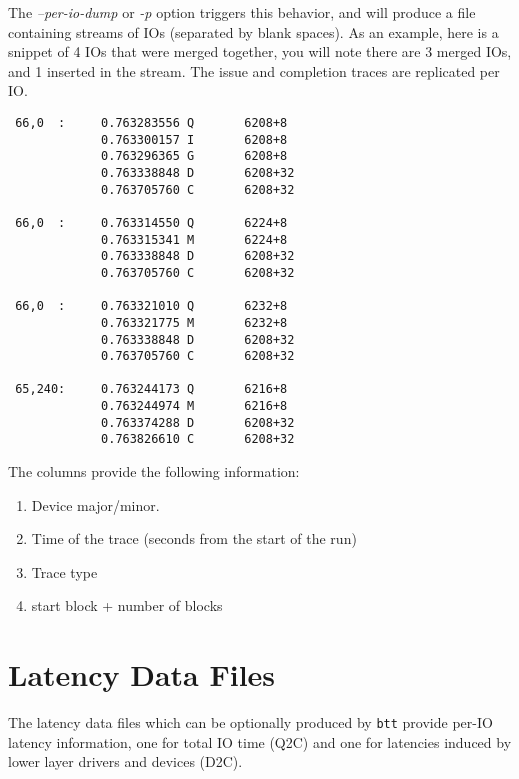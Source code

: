 \documentclass{article}
\begin{document}
  The \emph{--per-io-dump} or \emph{-p} option triggers this behavior,
  and will produce a file containing streams of IOs (separated by blank
  spaces). As an example, here is a snippet of 4 IOs that were merged
  together, you will note there are 3 merged IOs, and 1 inserted in the
  stream. The issue and completion traces are replicated per IO.

\begin{verbatim}
 66,0  :     0.763283556 Q       6208+8  
             0.763300157 I       6208+8  
             0.763296365 G       6208+8  
             0.763338848 D       6208+32 
             0.763705760 C       6208+32 

 66,0  :     0.763314550 Q       6224+8  
             0.763315341 M       6224+8  
             0.763338848 D       6208+32 
             0.763705760 C       6208+32 

 66,0  :     0.763321010 Q       6232+8  
             0.763321775 M       6232+8  
             0.763338848 D       6208+32 
             0.763705760 C       6208+32 

 65,240:     0.763244173 Q       6216+8  
             0.763244974 M       6216+8  
             0.763374288 D       6208+32 
             0.763826610 C       6208+32 
\end{verbatim}

  The columns provide the following information:

  \begin{enumerate}
    \item Device major/minor.

    \item Time of the trace (seconds from the start of the run)

    \item Trace type

    \item start block + number of blocks
  \end{enumerate}
 
\newpage\section{\label{sec:lat}\label{sec:lat-q2c}\label{sec:lat-d2c}Latency Data Files}

  The latency data files which can be optionally produced by \texttt{btt}
  provide per-IO latency information, one for total IO time (Q2C) and
  one for latencies induced by lower layer drivers and devices (D2C).
\end{document}
